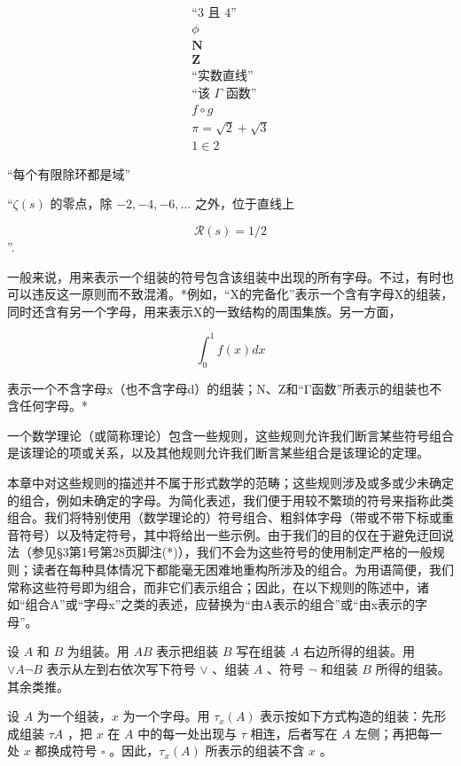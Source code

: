 \[
\begin{gathered}
\text{``3 且 4''} \\
\phi \\
\mathbf{N} \\
\mathbf{Z} \\
\text{``实数直线''} \\
\text{``该 }\Gamma\text{ 函数''} \\
f \circ g \\
\pi = \sqrt{2} + \sqrt{3} \\
1 \in 2
\end{gathered}
\]

“每个有限除环都是域”

“\(\zeta(s)\) 的零点，除 \(-2, -4, -6, \ldots\) 之外，位于直线上

\[
\mathcal{R}(s) = 1/2
\]''.

一般来说，用来表示一个组装的符号包含该组装中出现的所有字母。不过，有时也可以违反这一原则而不致混淆。*例如，“X的完备化”表示一个含有字母X的组装，同时还含有另一个字母，用来表示X的一致结构的周围集族。另一方面，

\[
\int_ {0} ^ {1} f (x) d x
\]

表示一个不含字母x（也不含字母d）的组装；N、Z和“Γ函数”所表示的组装也不含任何字母。*

一个数学理论（或简称理论）包含一些规则，这些规则允许我们断言某些符号组合是该理论的项或关系，以及其他规则允许我们断言某些组合是该理论的定理。

本章中对这些规则的描述并不属于形式数学的范畴；这些规则涉及或多或少未确定的组合，例如未确定的字母。为简化表述，我们便于用较不繁琐的符号来指称此类组合。我们将特别使用（数学理论的）符号组合、粗斜体字母（带或不带下标或重音符号）以及特定符号，其中将给出一些示例。由于我们的目的仅在于避免迂回说法（参见§3第1号第28页脚注(*)），我们不会为这些符号的使用制定严格的一般规则；读者在每种具体情况下都能毫无困难地重构所涉及的组合。为用语简便，我们常称这些符号即为组合，而非它们表示组合；因此，在以下规则的陈述中，诸如“组合A”或“字母x”之类的表述，应替换为“由A表示的组合”或“由x表示的字母”。

设 \(A\) 和 \(B\) 为组装。用 \(AB\) 表示把组装 \(B\) 写在组装 \(A\) 右边所得的组装。用 \(\vee A \neg B\) 表示从左到右依次写下符号 \(\vee\) 、组装 \(A\) 、符号 \(\neg\) 和组装 \(B\) 所得的组装。其余类推。

设 \(A\) 为一个组装，\(x\) 为一个字母。用 \(\tau_{x}(A)\) 表示按如下方式构造的组装：先形成组装 \(\tau A\) ，把 \(x\) 在 \(A\) 中的每一处出现与 \(\tau\) 相连，后者写在 \(A\) 左侧；再把每一处 \(x\) 都换成符号 \(\square\) 。因此，\(\tau_{x}(A)\) 所表示的组装不含 \(x\) 。


